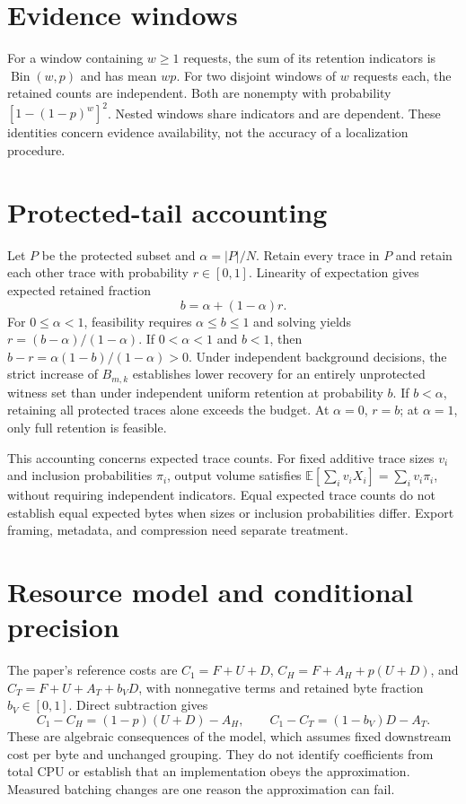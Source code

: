 \documentclass[11pt]{article}
\begin{document}
\section{Evidence windows}
For a window containing $w\ge1$ requests, the sum of its retention indicators is $\operatorname{Bin}(w,p)$ and has mean $wp$. For two disjoint windows of $w$ requests each, the retained counts are independent. Both are nonempty with probability $[1-(1-p)^w]^2$. Nested windows share indicators and are dependent. These identities concern evidence availability, not the accuracy of a localization procedure.

\section{Protected-tail accounting}
Let $P$ be the protected subset and $\alpha=|P|/N$. Retain every trace in $P$ and retain each other trace with probability $r\in[0,1]$. Linearity of expectation gives expected retained fraction
\[
b=\alpha+(1-\alpha)r.
\]
For $0\le\alpha<1$, feasibility requires $\alpha\le b\le1$ and solving yields $r=(b-\alpha)/(1-\alpha)$. If $0<\alpha<1$ and $b<1$, then $b-r=\alpha(1-b)/(1-\alpha)>0$. Under independent background decisions, the strict increase of $B_{m,k}$ establishes lower recovery for an entirely unprotected witness set than under independent uniform retention at probability $b$. If $b<\alpha$, retaining all protected traces alone exceeds the budget. At $\alpha=0$, $r=b$; at $\alpha=1$, only full retention is feasible.

This accounting concerns expected trace counts. For fixed additive trace sizes $v_i$ and inclusion probabilities $\pi_i$, output volume satisfies $\mathbb E[\sum_i v_iX_i]=\sum_i v_i\pi_i$, without requiring independent indicators. Equal expected trace counts do not establish equal expected bytes when sizes or inclusion probabilities differ. Export framing, metadata, and compression need separate treatment.

\section{Resource model and conditional precision}
The paper's reference costs are $C_1=F+U+D$, $C_H=F+A_H+p(U+D)$, and $C_T=F+U+A_T+b_VD$, with nonnegative terms and retained byte fraction $b_V\in[0,1]$. Direct subtraction gives
\[
C_1-C_H=(1-p)(U+D)-A_H,\qquad
C_1-C_T=(1-b_V)D-A_T.
\]
These are algebraic consequences of the model, which assumes fixed downstream cost per byte and unchanged grouping. They do not identify coefficients from total CPU or establish that an implementation obeys the approximation. Measured batching changes are one reason the approximation can fail.
\end{document}

